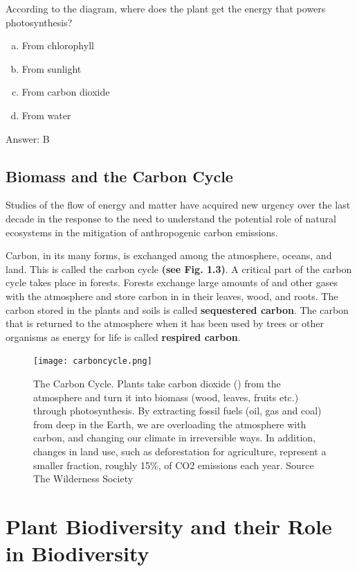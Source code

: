 \begin{problem}
According to the diagram, where does the plant get the energy that powers photosynthesis?
\begin{enumerate}[(a)]
\item From chlorophyll
\item From sunlight
\item From carbon dioxide
\item From water
\end{enumerate}  

Answer: B
\end{problem}

\subsection{Biomass and the Carbon Cycle}

Studies of the flow of energy and matter have acquired new urgency over the last decade in the response to the need to understand the potential role of natural ecosystems in the mitigation of anthropogenic carbon emissions.

   Carbon, in its many forms, is exchanged among the atmosphere, oceans, and land. This is called the carbon cycle \textbf{(see Fig. 1.3)}. A critical part of the carbon cycle takes place in forests. Forests exchange large amounts of  and other gases with the atmosphere and store carbon in in their leaves, wood, and roots. The carbon stored in the plants and soils is called \textbf{sequestered carbon}. The carbon that is returned to the atmosphere when it has been used by trees or other organisms as energy for life is called \textbf{respired carbon}. 
  
    \begin{figure}[ht]
    \centering
        \texttt{[image: carboncycle.png]}
        \caption{The Carbon Cycle. Plants take carbon dioxide (\CO) from the atmosphere and turn it into biomass (wood, leaves, fruits etc.) through photosynthesis. By extracting fossil fuels (oil, gas and coal) from deep in the Earth, we are overloading the atmosphere with carbon, and changing our climate in irreversible ways. In addition, changes in land use, such as deforestation for agriculture, represent a smaller fraction, roughly 15\%, of CO2 emissions each year. Source The Wilderness Society}
    \end{figure}

\section{Plant Biodiversity and their Role in Biodiversity}

